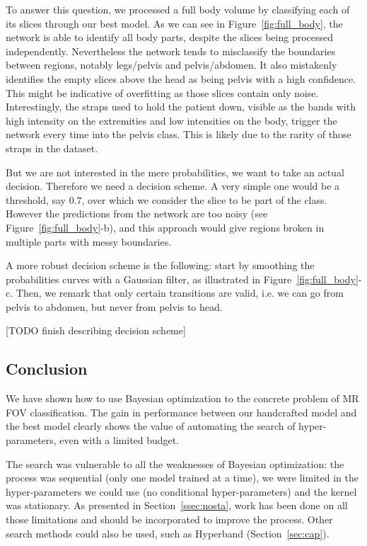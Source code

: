 To answer this question, we processed a full body volume by classifying each of its slices through our best model. 
As we can see in Figure~\ref{fig:full_body}, the network is able to identify all body parts, despite the slices being processed independently. Nevertheless the network tends to misclassify the boundaries between regions, notably legs/pelvis and pelvis/abdomen. It also mistakenly identifies the empty slices above the head as being pelvis with a high confidence. This might be indicative of overfitting as those slices contain only noise. Interestingly, the straps used to hold the patient down, visible as the bands with high intensity on the extremities and low intensities on the body, trigger the network every time into the pelvis class. This is likely due to the rarity of those straps in the dataset.

But we are not interested in the mere probabilities, we want to take an actual decision. Therefore we need a decision scheme. A very simple one would be a threshold, say $0.7$, over which we consider the slice to be part of the class. However the predictions from the network are too noisy (see Figure~\ref{fig:full_body}-b), and this approach would give regions broken in multiple parts with messy boundaries.

A more robust decision scheme is the following: start by smoothing the probabilities curves with a Gaussian filter, as illustrated in Figure~\ref{fig:full_body}-c. Then, we remark that only certain transitions are valid, i.e. we can go from pelvis to abdomen, but never from pelvis to head.

[TODO finish describing decision scheme]

\subsection{Conclusion}

We have shown how to use Bayesian optimization to the concrete problem of MR FOV classification. The gain in performance between our handcrafted model and the best model clearly shows the value of automating the search of hyper-parameters, even with a limited budget.

The search was vulnerable to all the weaknesses of Bayesian optimization: the process was sequential (only one model trained at a time), we were limited in the hyper-parameters we could use (no conditional hyper-parameters) and the kernel was stationary. As presented in Section~\ref{ssec:nosta}, work has been done on all those limitations and should be incorporated to improve the process. Other search methods could also be used, such as Hyperband (Section~\ref{sec:cap}). 


